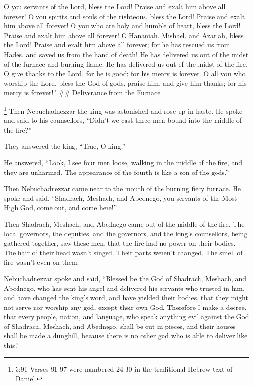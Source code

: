  O you servants of the Lord, bless the Lord! Praise and
exalt him above all forever!  O you spirits and souls of
the righteous, bless the Lord! Praise and exalt him above all forever!
 O you who are holy and humble of heart, bless the Lord!
Praise and exalt him above all forever!  O Hananiah,
Mishael, and Azariah, bless the Lord! Praise and exalt him above all
forever; for he has rescued us from Hades, and saved us from the hand of
death! He has delivered us out of the midst of the furnace and burning
flame. He has delivered us out of the midst of the fire.  O
give thanks to the Lord, for he is good; for his mercy is forever.
 O all you who worship the Lord, bless the God of gods,
praise him, and give him thanks; for his mercy is forever!'' \#\#
Deliverance from the Furnace

 \footnote{3:91 Verses 91-97 were numbered 24-30 in the
  traditional Hebrew text of Daniel.} Then Nebuchadnezzar the king was
astonished and rose up in haste. He spoke and said to his counsellors,
``Didn't we cast three men bound into the middle of the fire?''

They answered the king, ``True, O king.''

 He answered, ``Look, I see four men loose, walking in the
middle of the fire, and they are unharmed. The appearance of the fourth
is like a son of the gods.''

 Then Nebuchadnezzar came near to the mouth of the burning
fiery furnace. He spoke and said, ``Shadrach, Meshach, and Abednego, you
servants of the Most High God, come out, and come here!''

Then Shadrach, Meshach, and Abednego came out of the middle of the fire.
 The local governors, the deputies, and the governors, and
the king's counsellors, being gathered together, saw these men, that the
fire had no power on their bodies. The hair of their head wasn't singed.
Their pants weren't changed. The smell of fire wasn't even on them.

 Nebuchadnezzar spoke and said, ``Blessed be the God of
Shadrach, Meshach, and Abednego, who has sent his angel and delivered
his servants who trusted in him, and have changed the king's word, and
have yielded their bodies, that they might not serve nor worship any
god, except their own God.  Therefore I make a decree, that
every people, nation, and language, who speak anything evil against the
God of Shadrach, Meshach, and Abednego, shall be cut in pieces, and
their houses shall be made a dunghill, because there is no other god who
is able to deliver like this.''

